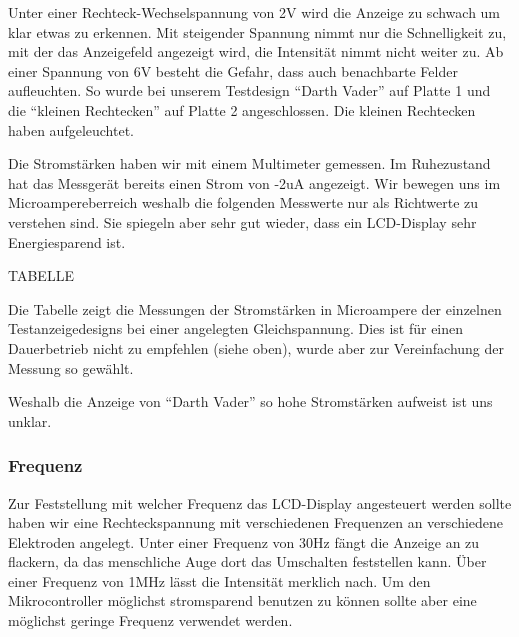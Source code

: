 Unter einer Rechteck-Wechselspannung von 2V wird die Anzeige zu schwach um klar etwas zu erkennen. Mit steigender Spannung nimmt nur die Schnelligkeit zu, mit der das Anzeigefeld angezeigt wird, die Intensität nimmt nicht weiter zu. Ab einer Spannung von 6V besteht die Gefahr, dass auch benachbarte Felder aufleuchten. So wurde bei unserem Testdesign “Darth Vader” auf Platte 1 und die “kleinen Rechtecken” auf Platte 2 angeschlossen. Die kleinen Rechtecken haben aufgeleuchtet.

Die Stromstärken haben wir mit einem Multimeter gemessen. Im Ruhezustand hat das Messgerät bereits einen Strom von -2uA angezeigt. Wir bewegen uns im Microampereberreich weshalb die folgenden Messwerte nur als Richtwerte zu verstehen sind. Sie spiegeln aber sehr gut wieder, dass ein LCD-Display sehr Energiesparend ist.

TABELLE

Die Tabelle zeigt die Messungen der Stromstärken in Microampere der einzelnen Testanzeigedesigns bei einer angelegten Gleichspannung. Dies ist für einen Dauerbetrieb nicht zu empfehlen (siehe oben), wurde aber zur Vereinfachung der Messung so gewählt.

Weshalb die Anzeige von “Darth Vader” so hohe Stromstärken aufweist ist uns unklar.

\subsubsection{Frequenz}
Zur Feststellung mit welcher Frequenz das LCD-Display angesteuert werden sollte haben wir eine Rechteckspannung mit verschiedenen Frequenzen an verschiedene Elektroden angelegt. Unter einer Frequenz von 30Hz fängt die Anzeige an zu flackern, da das menschliche Auge dort das Umschalten feststellen kann. Über einer Frequenz von 1MHz lässt die Intensität merklich nach. Um den Mikrocontroller möglichst stromsparend benutzen zu können sollte aber eine möglichst geringe Frequenz verwendet werden.

